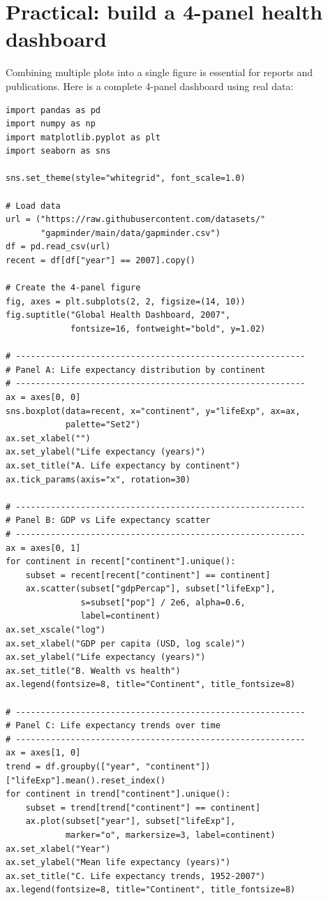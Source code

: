 \section{Practical: build a 4-panel health dashboard}

Combining multiple plots into a single figure is essential for reports and publications. Here is a complete 4-panel dashboard using real data:

\begin{verbatim}
import pandas as pd
import numpy as np
import matplotlib.pyplot as plt
import seaborn as sns

sns.set_theme(style="whitegrid", font_scale=1.0)

# Load data
url = ("https://raw.githubusercontent.com/datasets/"
       "gapminder/main/data/gapminder.csv")
df = pd.read_csv(url)
recent = df[df["year"] == 2007].copy()

# Create the 4-panel figure
fig, axes = plt.subplots(2, 2, figsize=(14, 10))
fig.suptitle("Global Health Dashboard, 2007",
             fontsize=16, fontweight="bold", y=1.02)

# ----------------------------------------------------------
# Panel A: Life expectancy distribution by continent
# ----------------------------------------------------------
ax = axes[0, 0]
sns.boxplot(data=recent, x="continent", y="lifeExp", ax=ax,
            palette="Set2")
ax.set_xlabel("")
ax.set_ylabel("Life expectancy (years)")
ax.set_title("A. Life expectancy by continent")
ax.tick_params(axis="x", rotation=30)

# ----------------------------------------------------------
# Panel B: GDP vs Life expectancy scatter
# ----------------------------------------------------------
ax = axes[0, 1]
for continent in recent["continent"].unique():
    subset = recent[recent["continent"] == continent]
    ax.scatter(subset["gdpPercap"], subset["lifeExp"],
               s=subset["pop"] / 2e6, alpha=0.6,
               label=continent)
ax.set_xscale("log")
ax.set_xlabel("GDP per capita (USD, log scale)")
ax.set_ylabel("Life expectancy (years)")
ax.set_title("B. Wealth vs health")
ax.legend(fontsize=8, title="Continent", title_fontsize=8)

# ----------------------------------------------------------
# Panel C: Life expectancy trends over time
# ----------------------------------------------------------
ax = axes[1, 0]
trend = df.groupby(["year", "continent"])["lifeExp"].mean().reset_index()
for continent in trend["continent"].unique():
    subset = trend[trend["continent"] == continent]
    ax.plot(subset["year"], subset["lifeExp"],
            marker="o", markersize=3, label=continent)
ax.set_xlabel("Year")
ax.set_ylabel("Mean life expectancy (years)")
ax.set_title("C. Life expectancy trends, 1952-2007")
ax.legend(fontsize=8, title="Continent", title_fontsize=8)


\end{verbatim}
